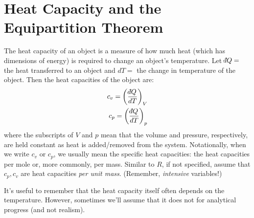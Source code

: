 \section{Heat Capacity and the Equipartition Theorem}\label{Equipartition}

The heat capacity of an object is a measure of how much heat (which has dimensions of energy) is required to change an object's temperature. Let  $\dbar Q=$ the heat transferred to an object and $dT=$ the change in temperature of the object. Then the heat capacities of the object are:
\begin{align}
    c_v=\left(\frac{\dbar Q}{dT}\right)_V\\
    c_p=\left(\frac{\dbar Q}{dT}\right)_p
\end{align}
where the subscripts of $V$ and $p$ mean that the volume and pressure, respectively, are held constant as heat is added/removed from the system. Notationally, when we write $c_v$ or $c_p$, we usually mean the specific heat capacities: the heat capacities per mole or, more commonly, per mass. Similar to $R$, if not specified, assume that $c_p, c_v$ are heat capacities \textit{per unit mass}. (Remember, \textit{intensive} variables!)

It's useful to remember that the heat capacity itself often depends on the temperature. However, sometimes we'll assume that it does not for analytical progress (and not realism).

